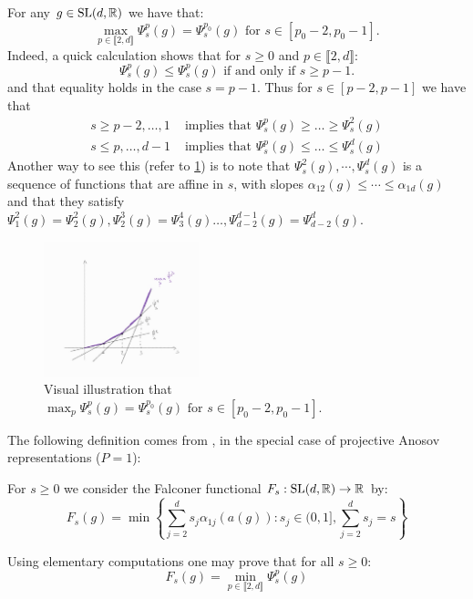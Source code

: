\documentclass{report}
\begin{document}
\begin{remark}
For any $g \in \operatorname{{\mathrm{SL}}}(d, \mathbb R)$ we have that:
\[
    \max_{p \in \llbracket 2, d \rrbracket} \Psi_s^p(g) = \Psi_s^{p_0}(g) \text{ for } s \in [p_0 - 2, p_0 -1].
\]
Indeed, a quick calculation shows that for $s \geq 0$ and $p \in \llbracket 2, d \rrbracket$:
\[
    \Psi_s^p(g) \leq \Psi_s^p(g) \text{ if and only if } s \geq p-1.
\]
and that equality holds in the case $s = p - 1$.
Thus for $s \in [p - 2, p-1]$ we have that
\begin{align*}
    s \geq p-2, \ldots, 1 &\text{ implies that } \Psi_s^p(g) \geq \ldots \geq \Psi_s^{2}(g)\\
    s \leq p, \ldots, d-1 &\text{ implies that } \Psi_s^p(g) \leq \ldots \leq \Psi_s^d(g)
\end{align*}
Another way to see this (refer to \cref*{fig:max}) is to note that $\Psi_s^2(g), \cdots, \Psi_s^d(g)$ is a sequence of functions that are affine in $s$, with slopes $\alpha_{12}(g) \leq \cdots \leq \alpha_{1d}(g)$ and that they satisfy $\Psi_1^2(g) = \Psi_2^2(g), \Psi_2^3(g) = \Psi_3^4(g) \ldots, \Psi_{d-2}^{d-1}(g) = \Psi_{d-2}^d(g)$.
\begin{figure}[h]
    \centering
    \includegraphics[width=0.4\textwidth]{max.jpg}
    \caption{Visual illustration that $\max_p\Psi_s^p(g) = \Psi_s^{p_0}(g) \text{ for } s \in [p_0 - 2, p_0 -1]$.}
    \label{fig:max}
\end{figure}    
\end{remark}


The following definition comes from \cite{ledrappier_dimension_2023}, in the special case of projective Anosov representations ($P = {1}$):
\begin{definition}
    For $s \geq 0$ we consider the Falconer functional $F_s : \operatorname{{\mathrm{SL}}}(d, \mathbb R) \to \mathbb R$ by:
    \[
        F_s(g) = \min 
        \left\{
            \sum_{j=2}^d s_j \alpha_{1j}(a(g)) : s_j \in (0,1], \sum_{j=2}^d s_j = s 
        \right\}
    \]
\end{definition}

\begin{remark}
    Using elementary computations one may prove that for all $s \geq 0$:
    \[
        F_s(g) = \min_{p \in \llbracket 2, d \rrbracket} \Psi_s^p(g)
    \]
\end{remark}
\end{document}
